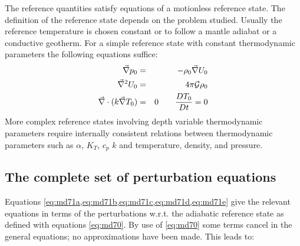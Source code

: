 
\vspace{0.5cm}

The reference quantities satisfy equations of a motionless reference state. The definition
of the reference state depends on the problem studied. Usually the reference temperature
is chosen constant or to follow a mantle adiabat or a conductive geotherm. For a simple
reference state with constant thermodynamic parameters the following equations suffice:
\begin{eqnarray}
\vec\nabla p_0 &=& -\rho_0 \vec\nabla U_0 \\
\vec\nabla^2 U_0 &=& 4\pi {\cal G} \rho_0 \\
\vec\nabla \cdot ( k \vec\nabla T_0) &=& 0 \qquad \frac{DT_0}{Dt}=0
\label{eq:md70}
\end{eqnarray}
More complex reference states involving depth variable thermodynamic parameters
require internally consistent relations between thermodynamic parameters such as
$\alpha$, $K_T$, $c_p$ $k$ and temperature, density, and pressure.



\subsection{The complete set of perturbation equations}

Equations \eqref{eq:md71a,eq:md71b,eq:md71c,eq:md71d,eq:md71e} give the relevant equations in terms of the perturbations w.r.t. the
adiabatic reference state as defined with equations \eqref{eq:md70}. By use of \eqref{eq:md70} 
some terms cancel in the general equations; no approximations have been made. This leads to:

